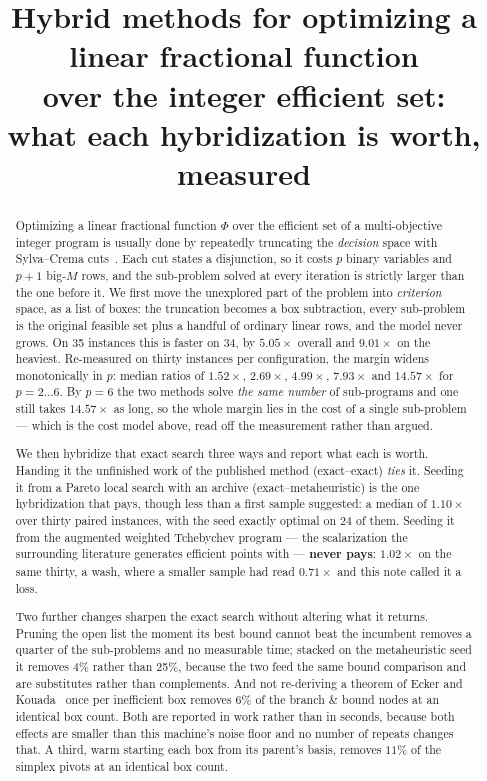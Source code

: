 \documentclass[11pt,a4paper]{article}
\title{Hybrid methods for optimizing a linear fractional function\\
over the integer efficient set:\\
\large what each hybridization is worth, measured}
\author{}
\date{}
\begin{document}
\maketitle

\begin{abstract}
Optimizing a linear fractional function $\Phi$ over the efficient set of a
multi-objective integer program is usually done by repeatedly truncating the
\emph{decision} space with Sylva--Crema cuts~\cite{sylvacrema}. Each cut
states a disjunction, so
it costs $p$ binary variables and $p+1$ big-$M$ rows, and the sub-problem
solved at every iteration is strictly larger than the one before it. We first
move the unexplored part of the problem into \emph{criterion} space, as a list
of boxes: the truncation becomes a box subtraction, every sub-problem is the
original feasible set plus a handful of ordinary linear rows, and the model
never grows. On 35 instances this is faster on 34, by $5.05\times$ overall and
$9.01\times$ on the heaviest. Re-measured on thirty instances per
configuration, the margin widens monotonically in $p$: median ratios of
$1.52\times$, $2.69\times$, $4.99\times$, $7.93\times$ and $14.57\times$ for
$p = 2 \dots 6$. By $p = 6$ the two methods solve \emph{the same number} of
sub-programs and one still takes $14.57\times$ as long, so the whole margin
lies in the cost of a single sub-problem --- which is the cost model above,
read off the measurement rather than argued.

We then hybridize that exact search three ways and report what each is worth.
Handing it the unfinished work of the published method (exact--exact)
\emph{ties} it. Seeding it from a Pareto local search with an archive
(exact--metaheuristic) is the one hybridization that pays, though less than a
first sample suggested: a median of $1.10\times$ over thirty paired instances,
with the seed exactly optimal on $24$ of them. Seeding it from the augmented
weighted Tchebychev program --- the scalarization the surrounding literature
generates efficient points with --- \textbf{never pays}: $1.02\times$ on the
same thirty, a wash, where a smaller sample had read $0.71\times$ and this note
called it a loss.

Two further changes sharpen the exact search without altering what it returns.
Pruning the open list the moment its best bound cannot beat the incumbent
removes a quarter of the sub-problems and no measurable time; stacked on the
metaheuristic seed it removes 4\% rather than 25\%, because the two feed the
same bound comparison and are substitutes rather than complements. And not
re-deriving a theorem of Ecker and Kouada~\cite{eckerkouada} once per
inefficient box removes
$6\%$ of the branch \& bound nodes at an identical box count. Both are reported
in work rather than in seconds, because both effects are smaller than this
machine's noise floor and no number of repeats changes that.  A third, warm
starting each box from its parent's basis, removes $11\%$ of the simplex
pivots at an identical box count.


\end{abstract}
\end{document}
